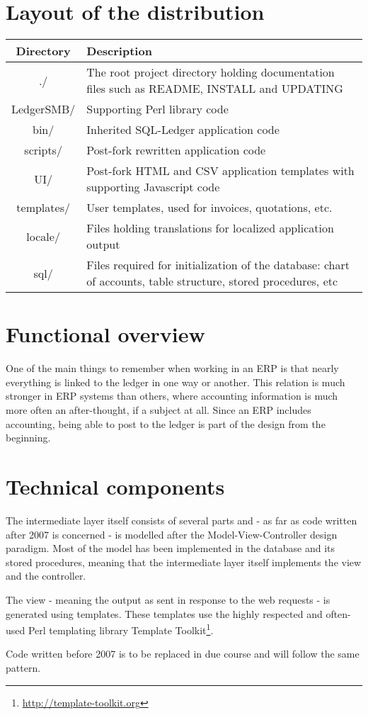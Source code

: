\section{Layout of the distribution}


\begin{tabular}{|c|p{9cm}|}
\hline Directory &  Description \\
\hline
./ & The root project directory holding documentation files such as
  README, INSTALL and UPDATING  \\ 
LedgerSMB/ & Supporting Perl library code \\
bin/ & Inherited SQL-Ledger application code \\
scripts/ & Post-fork rewritten application code \\
UI/ & Post-fork HTML and CSV application templates with supporting Javascript code \\
templates/ & User templates, used for invoices, quotations, etc. \\
locale/ & Files holding translations for localized application output \\
sql/ & Files required for initialization of the database: chart of accounts,
 table structure, stored procedures, etc \\
\hline 
\end{tabular} 


\section{Functional overview}

One of the main things to remember when working in an ERP is that nearly everything is
linked to the ledger in one way or another.  This relation is much stronger in ERP
systems than others, where accounting information is much more often an after-thought,
if a subject at all.  Since an ERP includes accounting, being able to post to the
ledger is part of the design from the beginning.





\section{Technical components}

The intermediate layer itself consists of several parts and - as far as code written
after 2007 is concerned - is modelled after the Model-View-Controller design paradigm.
Most of the model has been implemented in the database and its stored procedures, meaning
that the intermediate layer itself implements the view and the controller.

The view - meaning the output as sent in response to the web requests - is generated
using templates.  These templates use the highly respected and often-used Perl templating
library Template Toolkit\footnote{\url{http://template-toolkit.org}}.

Code written before 2007 is to be replaced in due course and will follow the same
pattern.



